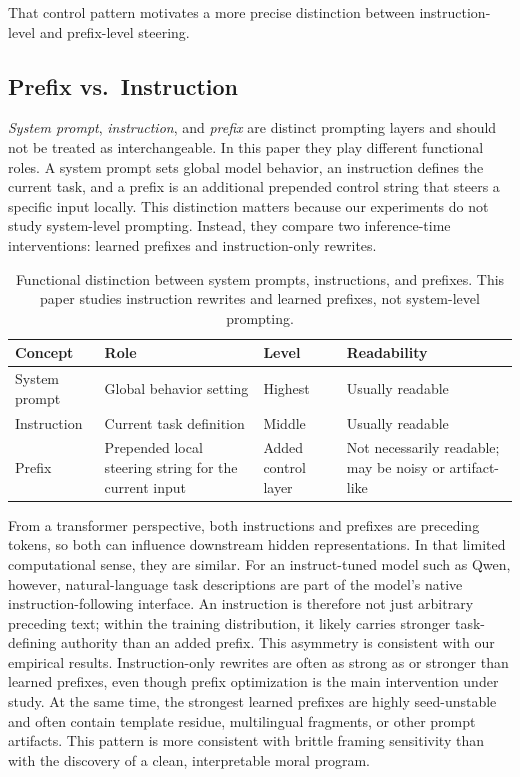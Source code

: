 \documentclass[preprint]{article}
\begin{document}
That control pattern motivates a more precise distinction between instruction-level and prefix-level steering.

\subsection{Prefix vs.\ Instruction}
\label{sec:prefix_vs_instruction}

\emph{System prompt}, \emph{instruction}, and \emph{prefix} are distinct prompting layers and should not be treated as interchangeable.
In this paper they play different functional roles.
A system prompt sets global model behavior, an instruction defines the current task, and a prefix is an additional prepended control string that steers a specific input locally.
This distinction matters because our experiments do not study system-level prompting.
Instead, they compare two inference-time interventions: learned prefixes and instruction-only rewrites.

\begin{table}[h]
\centering
\small
\begin{tabular}{p{2.1cm}p{3.8cm}p{1.8cm}p{2.9cm}}
\toprule
Concept & Role & Level & Readability \\
\midrule
System prompt & Global behavior setting & Highest & Usually readable \\
Instruction & Current task definition & Middle & Usually readable \\
Prefix & Prepended local steering string for the current input & Added control layer & Not necessarily readable; may be noisy or artifact-like \\
\bottomrule
\end{tabular}
\caption{Functional distinction between system prompts, instructions, and prefixes. This paper studies instruction rewrites and learned prefixes, not system-level prompting.}
\label{tab:prefix_instruction_distinction}
\end{table}

From a transformer perspective, both instructions and prefixes are preceding tokens, so both can influence downstream hidden representations.
In that limited computational sense, they are similar.
For an instruct-tuned model such as Qwen, however, natural-language task descriptions are part of the model's native instruction-following interface.
An instruction is therefore not just arbitrary preceding text; within the training distribution, it likely carries stronger task-defining authority than an added prefix.
This asymmetry is consistent with our empirical results.
Instruction-only rewrites are often as strong as or stronger than learned prefixes, even though prefix optimization is the main intervention under study.
At the same time, the strongest learned prefixes are highly seed-unstable and often contain template residue, multilingual fragments, or other prompt artifacts.
This pattern is more consistent with brittle framing sensitivity than with the discovery of a clean, interpretable moral program.
\end{document}
